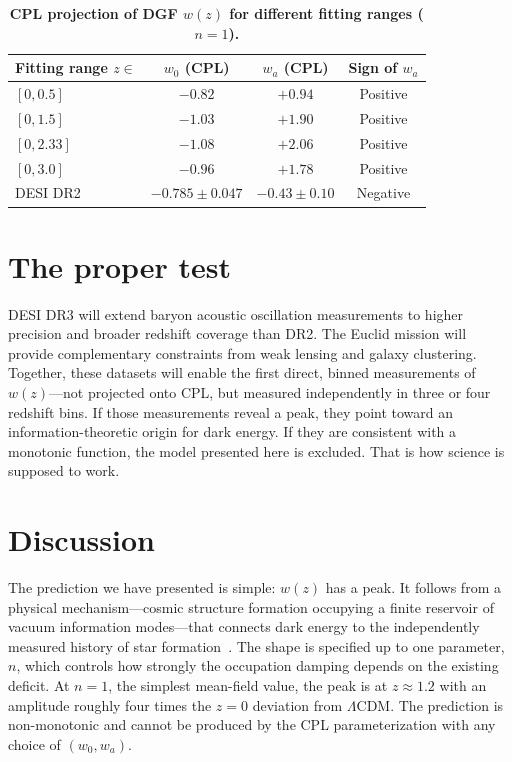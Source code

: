 \documentclass[12pt,a4paper]{article}
\begin{document}
\begin{table}[htbp]
\centering
\caption{\bf CPL projection of DGF $w(z)$ for different fitting ranges ($n=1$).}
\label{tab:proj}
\begin{tabular}{lccc}
\toprule
Fitting range $z\in$ & $w_0$ (CPL) & $w_a$ (CPL) & Sign of $w_a$ \\
\midrule
$[0,0.5]$  & $-0.82$ & $+0.94$ & Positive \\
$[0,1.5]$  & $-1.03$ & $+1.90$ & Positive \\
$[0,2.33]$ & $-1.08$ & $+2.06$ & Positive \\
$[0,3.0]$  & $-0.96$ & $+1.78$ & Positive \\
\midrule
DESI DR2~\cite{li2026} & $-0.785\pm0.047$ & $-0.43\pm0.10$ & Negative \\
\bottomrule
\end{tabular}
\end{table}

\section*{The proper test}

DESI DR3 will extend baryon acoustic oscillation measurements to higher precision and broader redshift coverage than DR2. The Euclid mission will provide complementary constraints from weak lensing and galaxy clustering. Together, these datasets will enable the first direct, binned measurements of $w(z)$---not projected onto CPL, but measured independently in three or four redshift bins. If those measurements reveal a peak, they point toward an information-theoretic origin for dark energy. If they are consistent with a monotonic function, the model presented here is excluded. That is how science is supposed to work.

\section*{Discussion}

The prediction we have presented is simple: $w(z)$ has a peak. It follows from a physical mechanism---cosmic structure formation occupying a finite reservoir of vacuum information modes---that connects dark energy to the independently measured history of star formation~\cite{madau2014}. The shape is specified up to one parameter, $n$, which controls how strongly the occupation damping depends on the existing deficit. At $n=1$, the simplest mean-field value, the peak is at $z\approx1.2$ with an amplitude roughly four times the $z=0$ deviation from $\Lambda$CDM. The prediction is non-monotonic and cannot be produced by the CPL parameterization with any choice of $(w_0,w_a)$.
\end{document}

